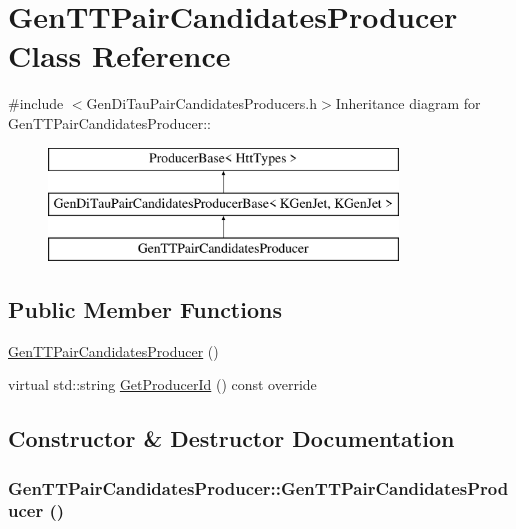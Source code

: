 \hypertarget{classGenTTPairCandidatesProducer}{
\section{GenTTPairCandidatesProducer Class Reference}
\label{classGenTTPairCandidatesProducer}
}


{\ttfamily \#include $<$GenDiTauPairCandidatesProducers.h$>$}Inheritance diagram for GenTTPairCandidatesProducer::\begin{figure}[H]
\begin{center}
\leavevmode
\includegraphics[height=3cm]{classGenTTPairCandidatesProducer}
\end{center}
\end{figure}
\subsection*{Public Member Functions}
\begin{DoxyCompactItemize}
\item 
\hyperlink{classGenTTPairCandidatesProducer_a3092efb0adbed79ea7a014a404c04217}{GenTTPairCandidatesProducer} ()
\item 
virtual std::string \hyperlink{classGenTTPairCandidatesProducer_afa844a16818746ebda6d486eaaf79ef2}{GetProducerId} () const override
\end{DoxyCompactItemize}


\subsection{Constructor \& Destructor Documentation}
\hypertarget{classGenTTPairCandidatesProducer_a3092efb0adbed79ea7a014a404c04217}{
\subsubsection[{GenTTPairCandidatesProducer}]{\setlength{\rightskip}{0pt plus 5cm}GenTTPairCandidatesProducer::GenTTPairCandidatesProducer ()}}
\label{classGenTTPairCandidatesProducer_a3092efb0adbed79ea7a014a404c04217}


